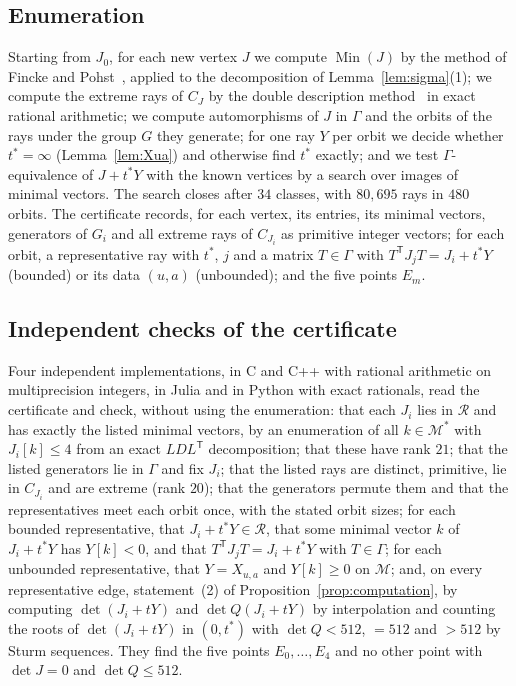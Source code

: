 \documentclass[11pt]{amsart}
\theoremstyle{definition}
\theoremstyle{remark}
\numberwithin{equation}{section}
\numberwithin{table}{section}
\numberwithin{figure}{section}
\newcommand{\M}{\mathcal{M}}
\newcommand{\Rk}{\mathcal{R}}
\newcommand{\Min}{\operatorname{Min}}
\newcommand{\T}{\mathsf{T}}
\begin{document}
\subsection*{Enumeration} Starting from $J_0$, for each new vertex $J$ we compute $\Min(J)$ by the method of Fincke and Pohst~\cite{FinckePohst1985}, applied to the decomposition of Lemma~\ref{lem:sigma}(1); we compute the extreme rays of $C_J$ by the double description method~\cite{FukudaProdon1996} in exact rational arithmetic; we compute automorphisms of $J$ in $\Gamma$ and the orbits of the rays under the group $G$ they generate; for one ray $Y$ per orbit we decide whether $t^*=\infty$ (Lemma~\ref{lem:Xua}) and otherwise find $t^*$ exactly; and we test $\Gamma$-equivalence of $J+t^*Y$ with the known vertices by a search over images of minimal vectors. The search closes after $34$ classes, with $80{,}695$ rays in $480$ orbits. The certificate records, for each vertex, its entries, its minimal vectors, generators of $G_i$ and all extreme rays of $C_{J_i}$ as primitive integer vectors; for each orbit, a representative ray with $t^*$, $j$ and a matrix $T\in\Gamma$ with $T^\T J_jT=J_i+t^*Y$ (bounded) or its data $(u,a)$ (unbounded); and the five points $E_m$.

\subsection*{Independent checks of the certificate}
Four independent implementations, in C and C++ with rational arithmetic on multiprecision integers, in Julia and in Python with exact rationals, read the certificate and check, without using the enumeration: that each $J_i$ lies in $\Rk$ and has exactly the listed minimal vectors, by an enumeration of all $k\in\M^*$ with $J_i[k]\le4$ from an exact $LDL^\T$ decomposition; that these have rank $21$; that the listed generators lie in $\Gamma$ and fix $J_i$; that the listed rays are distinct, primitive, lie in $C_{J_i}$ and are extreme (rank $20$); that the generators permute them and that the representatives meet each orbit once, with the stated orbit sizes; for each bounded representative, that $J_i+t^*Y\in\Rk$, that some minimal vector $k$ of $J_i+t^*Y$ has $Y[k]<0$, and that $T^\T J_jT=J_i+t^*Y$ with $T\in\Gamma$; for each unbounded representative, that $Y=X_{u,a}$ and $Y[k]\ge0$ on $\M$; and, on every representative edge, statement~(2) of Proposition~\ref{prop:computation}, by computing $\det(J_i+tY)$ and $\det Q(J_i+tY)$ by interpolation and counting the roots of $\det(J_i+tY)$ in $(0,t^*)$ with $\det Q<512$, $=512$ and $>512$ by Sturm sequences. They find the five points $E_0,\dots,E_4$ and no other point with $\det J=0$ and $\det Q\le512$.
\end{document}
